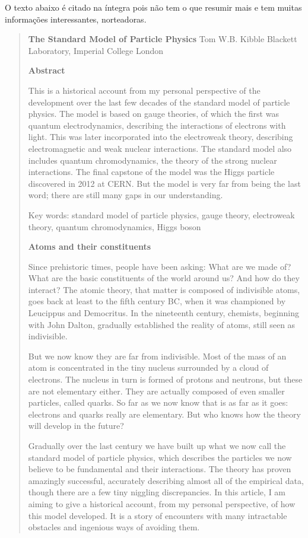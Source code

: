 O texto abaixo é citado na íntegra pois não tem o que resumir mais e tem muitas informações interessantes, norteadoras.
\begin{quote}
\begin{center}
\textbf{The Standard Model of Particle Physics}
Tom W.B. Kibble
Blackett Laboratory, Imperial College London
\end{center}

\textbf{Abstract}

This is a historical account from my personal perspective of the development over the last few decades of the standard model of particle physics. The model is based on gauge theories, of which the first was quantum electrodynamics, describing the interactions of electrons with light. This was later incorporated into the electroweak theory, describing electromagnetic and weak nuclear interactions. The standard model also includes quantum chromodynamics, the theory of the strong nuclear interactions. The final capstone of the model was the Higgs particle discovered in 2012 at CERN. But the model is very far from being the last word; there are still many gaps in our understanding.

Key words: standard model of particle physics, gauge theory, electroweak theory, quantum
chromodynamics, Higgs boson

\textbf{Atoms and their constituents}

Since prehistoric times, people have been asking: What are we made of? What are the basic constituents of the world around us? And how do they interact? The atomic theory, that matter is composed of indivisible atoms, goes back at least to the fifth century BC, when it was championed by Leucippus and Democritus. In the nineteenth century, chemists, beginning with John Dalton, gradually established the reality of atoms, still seen as indivisible.

But we now know they are far from indivisible. Most of the mass of an atom is concentrated in the tiny nucleus surrounded by a cloud of electrons. The nucleus in turn is formed of protons and neutrons, but these are not elementary either. They are actually composed of even smaller particles, called quarks. So far as we now know that is as far as it goes: electrons and quarks really are elementary. But who knows how the theory will develop in the future?

Gradually over the last century we have built up what we now call the standard model of particle physics, which describes the particles we now believe to be fundamental and their interactions. The theory has proven amazingly successful, accurately describing almost all of the empirical data, though there are a few tiny niggling discrepancies. In this article, I am aiming to give a historical account, from my personal perspective, of how this model developed. It is a story of encounters with many intractable obstacles and ingenious ways of avoiding them.


\end{quote}
